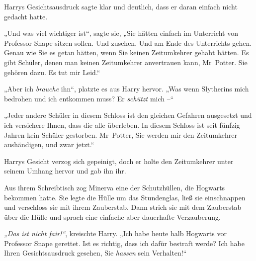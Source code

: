Harrys Gesichtsausdruck sagte klar und deutlich, dass er daran einfach nicht gedacht hatte. 

„Und was viel wichtiger ist“, sagte sie, „Sie hätten einfach im Unterricht von Professor Snape sitzen sollen. Und zusehen. Und am Ende des Unterrichts gehen. Genau wie Sie es getan hätten, wenn Sie keinen Zeitumkehrer gehabt hätten. Es gibt Schüler, denen man keinen Zeitumkehrer anvertrauen kann, Mr~Potter. Sie gehören dazu. Es tut mir Leid.“ 

„Aber ich \emph{brauche} ihn“, platzte es aus Harry hervor. „Was wenn Slytherins mich bedrohen und ich entkommen muss? Er \emph{schützt} mich –“ 

„Jeder andere Schüler in diesem Schloss ist den gleichen Gefahren ausgesetzt und ich versichere Ihnen, dass die alle überleben. In diesem Schloss ist seit fünfzig Jahren kein Schüler gestorben. Mr~Potter, Sie werden mir den Zeitumkehrer aushändigen, und zwar jetzt.“ 

Harrys Gesicht verzog sich gepeinigt, doch er holte den Zeitumkehrer unter seinem Umhang hervor und gab ihn ihr. 

Aus ihrem Schreibtisch zog Minerva eine der Schutzhüllen, die Hogwarts bekommen hatte. Sie legte die Hülle um das Stundenglas, ließ sie einschnappen und verschloss sie mit ihrem Zauberstab. Dann strich sie mit dem Zauberstab über die Hülle und sprach eine einfache aber dauerhafte Verzauberung. 

\emph{„Das ist nicht fair!“}, kreischte Harry. „Ich habe heute halb Hogwarts vor Professor Snape gerettet. Ist es richtig, dass ich dafür bestraft werde? Ich habe Ihren Gesichtsausdruck gesehen, Sie \emph{hassen} sein Verhalten!“ 

